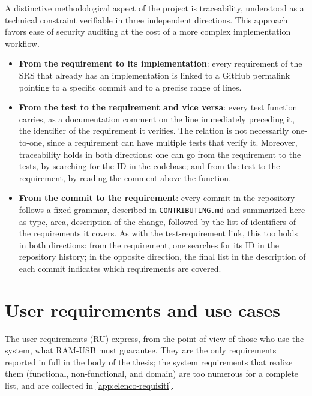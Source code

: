 A distinctive methodological aspect of the project is traceability, understood as a technical constraint
verifiable in three independent directions.
This approach favors ease of security auditing at the cost of a more complex implementation
workflow.

\begin{itemize}
    \item \textbf{From the requirement to its implementation}: every requirement of the SRS that already has an implementation is linked
    to a GitHub permalink pointing to a specific commit and to a precise range of lines.

    \item \textbf{From the test to the requirement and vice versa}: every test function carries, as a documentation comment
    on the line immediately preceding it, the identifier of the requirement it verifies.
    The relation is not necessarily one-to-one, since a requirement can have multiple tests that verify it.
    Moreover, traceability holds in both directions: one can go from the requirement
    to the tests, by searching for the ID in the codebase; and from the test to the requirement, by reading the comment above the function.
    \item \textbf{From the commit to the requirement}: every commit in the repository follows a fixed grammar,
    described in
    \texttt{CONTRIBUTING.md} \cite{ramusb-contributing-commit-structure}
     and summarized here as type, area, description of the change,
    followed by the list of identifiers of the requirements it covers.
    As with the test-requirement link, this too holds in both directions:
    from the requirement, one searches for its ID in the repository history; in the opposite direction,
    the final list in the description of each commit indicates which requirements are covered.
\end{itemize}


\section{User requirements and use cases}

The user requirements (RU) express, from the point of view of those who use the system, what RAM-USB must guarantee.
They are the only requirements reported in full in the body of the thesis; the system requirements that
realize them (functional, non-functional, and domain) are too numerous for a complete list, and are
collected in \autoref{app:elenco-requisiti}.

